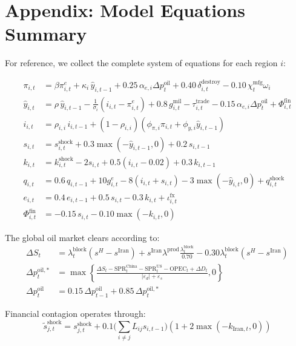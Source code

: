 \documentclass[12pt]{article}
\begin{document}

\newpage
\appendix
\section*{Appendix: Model Equations Summary}

For reference, we collect the complete system of equations for each region $i$:

\begin{align}
\pi_{i,t} &= \beta \pi^e_{i,t} + \kappa_i \, \hat{y}_{i,t-1} + 0.25\,\alpha_{e,i}\Delta p^{\text{oil}}_t + 0.40\,\delta^{\text{destroy}}_{i,t} - 0.10\,\chi^{\text{mfg}}_t\omega_i \tag{A.1} \\[6pt]
\hat{y}_{i,t} &= \rho \, \hat{y}_{i,t-1} - \frac{1}{\sigma_i}(i_{i,t} - \pi^e_{i,t}) + 0.8 \, g^{\text{mil}}_{i,t} - \tau^{\text{trade}}_{i,t} - 0.15 \, \alpha_{e,i} \Delta p^{\text{oil}}_t + \Phi^{\text{fin}}_{i,t} \tag{A.2} \\[6pt]
i_{i,t} &= \rho_{i,i} \, i_{i,t-1} + (1-\rho_{i,i})(\phi_{\pi,i} \pi_{i,t} + \phi_{y,i} \hat{y}_{i,t-1}) \tag{A.3} \\[6pt]
s_{i,t} &= s^{\text{shock}}_{i,t} + 0.3 \max(-\hat{y}_{i,t-1}, 0) + 0.2 \, s_{i,t-1} \tag{A.4} \\[6pt]
k_{i,t} &= k^{\text{shock}}_{i,t} - 2 s_{i,t} + 0.5(i_{i,t} - 0.02) + 0.3 \, k_{i,t-1} \tag{A.5} \\[6pt]
q_{i,t} &= 0.6 \, q_{i,t-1} + 10 g^e_{i,t} - 8(i_{i,t} + s_{i,t}) - 3 \max(-\hat{y}_{i,t},0) + q^{\text{shock}}_{i,t} \tag{A.6} \\[6pt]
e_{i,t} &= 0.4 \, e_{i,t-1} + 0.5 \, s_{i,t} - 0.3 \, k_{i,t} + \iota^{\text{fx}}_{i,t} \tag{A.7} \\[6pt]
\Phi^{\text{fin}}_{i,t} &= -0.15 \, s_{i,t} - 0.10 \max(-k_{i,t}, 0) \tag{A.8}
\end{align}

The global oil market clears according to:
\begin{align}
\Delta S_t &= \lambda^{\text{block}}_t (s^H - s^{\text{Iran}}) + s^{\text{Iran}}\lambda^{\text{prod}}\frac{\lambda^{\text{block}}_t}{0.70} - 0.30 \lambda^{\text{block}}_t (s^H - s^{\text{Iran}}) \tag{A.9} \\[6pt]
\Delta p^{\text{oil},*}_t &= \max\left\{\frac{\Delta S_t-\text{SPR}^{\text{China}}_t-\text{SPR}^{\text{US}}_t-\text{OPEC}_t+\Delta D_t}{|\varepsilon_d|+\varepsilon_s},0\right\} \tag{A.10}\\[6pt]
\Delta p^{\text{oil}}_t &=0.15\,\Delta p^{\text{oil}}_{t-1}+0.85\,\Delta p^{\text{oil},*}_t \tag{A.11}
\end{align}

Financial contagion operates through:
\begin{equation}
\tilde{s}^{\text{shock}}_{j,t} = s^{\text{shock}}_{j,t} + 0.1 \Big(\textstyle\sum_{i \neq j} L_{ij} s_{i,t-1}\Big)(1 + 2\max(-k_{\text{Iran},t}, 0)) \tag{A.12}
\end{equation}
\end{document}
